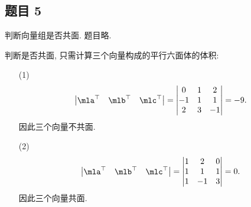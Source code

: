 \subsection*{ 题目 5 }
\begin{problem*}
    判断向量组是否共面. 题目略.
\end{problem*}
\begin{solution}
    判断是否共面, 只需计算三个向量构成的平行六面体的体积:
    \begin{enumerate}
        \item[(1)]
        \[
        \left|
            \begin{matrix}
                \mla^\top & \mlb^\top & \mlc^\top
            \end{matrix}
        \right| = 
        \left|
            \begin{matrix}
                 0 & 1 & 2 \\
                -1 & 1 & 1 \\
                 2 & 3 & -1
            \end{matrix}
        \right| = -9.
        \]
        因此三个向量不共面.
        \item[(2)] \[
        \left|
            \begin{matrix}
                \mla^\top & \mlb^\top & \mlc^\top
            \end{matrix}
        \right| = 
        \left|
            \begin{matrix}
                1 &  2 & 0 \\
                1 &  1 & 1 \\
                1 & -1 & 3
            \end{matrix}
        \right| = 0.
        \]
        因此三个向量共面.
    \end{enumerate}
\end{solution}

\newcommand{\lvec}[1]{\overrightarrow{#1}}
